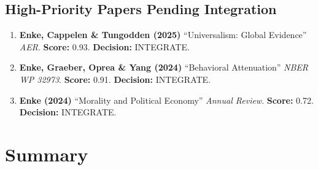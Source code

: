 \subsection{High-Priority Papers Pending Integration}

\begin{enumerate}
    \item \textbf{Enke, Cappelen \& Tungodden (2025)} ``Universalism: Global Evidence''
          \textit{AER}. \textbf{Score:} 0.93. \textbf{Decision:} INTEGRATE.

    \item \textbf{Enke, Graeber, Oprea \& Yang (2024)} ``Behavioral Attenuation''
          \textit{NBER WP 32973}. \textbf{Score:} 0.91. \textbf{Decision:} INTEGRATE.

    \item \textbf{Enke (2024)} ``Morality and Political Economy''
          \textit{Annual Review}. \textbf{Score:} 0.72. \textbf{Decision:} INTEGRATE.
\end{enumerate}


\section{Summary}
\label{sec:enk-summary}

